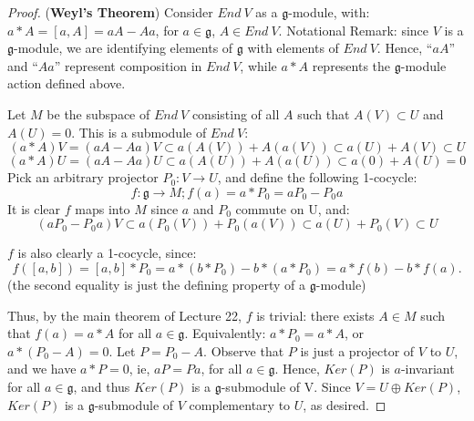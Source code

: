\documentclass{amsart}
\newcommand*{\g}{\mathfrak{g}}
\begin{document}
\begin{proof} (\textbf{Weyl's Theorem})
Consider $End\ V$ as a $\g$-module, with: 
$a*A = [a,A] = aA - Aa$, for $a \in \g$, $A \in End\ V$. 
Notational Remark: since $V$ is a $\g$-module, we are 
identifying elements of $\g$ with elements of $End\ V$.
Hence, ``$aA$'' and ``$Aa$'' represent composition in 
$End\ V$, while $a*A$ represents the $\g$-module action defined above.

Let $M$ be the subspace of $End\ V$ consisting of all $A$ such 
that $A(V) \subset U$ and $A(U)=0$. This is a submodule of $End\ V$:
$$(a*A)V = (aA - Aa)V \subset a(A(V)) + A(a(V)) \subset a(U) + A(V) \subset U$$
$$(a*A)U = (aA - Aa)U \subset a(A(U)) + A(a(U)) \subset a(0) + A(U) = 0$$
Pick an arbitrary projector $P_0:V \longrightarrow U$, and define 
the following 1-cocycle:
$$f: \g \longrightarrow M; f(a) = a*P_0 = a P_0 - P_0 a$$
It is clear $f$ maps into $M$ since $a$ and $P_0$ commute on U, and: 
$$(a P_0 - P_0 a)V \subset a(P_0(V)) + P_0(a(V)) 
\subset a(U) + P_0(V) \subset U$$

$f$ is also clearly a 1-cocycle, since:
$$f([a,b]) = [a,b]*P_0 = a*(b*P_0) - b*(a*P_0) = a*f(b) - b*f(a).$$
(the second equality is just the defining property of a $\g$-module)

Thus, by the main theorem of Lecture 22, $f$ is trivial: 
there exists $A \in M$ such that
$f(a) = a*A$ for all $a \in \g$. Equivalently: $a*P_0 = a*A$, 
or $a*(P_0 - A) = 0$. Let $P = P_0 - A$. Observe 
that $P$ is just a projector of $V$ to $U$, and we have $a*P = 0$, 
ie, $aP = Pa$, for all $a \in \g$. Hence, $Ker(P)$ is $a$-invariant
for all $a \in \g$, and thus $Ker(P)$ is a $\g$-submodule of V. 
Since $V = U \oplus Ker(P)$, $Ker(P)$ is a $\g$-submodule of $V$
complementary to $U$, as desired.
\end{proof}
\end{document}
